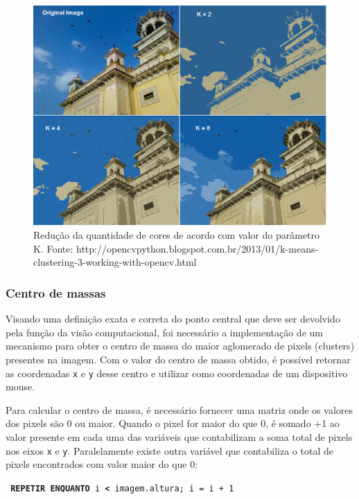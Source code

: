 \documentclass[12pt]{article}
\begin{document}
	\begin{figure}[ht!]
	\begin{center}
		\includegraphics[scale=0.3]{img/kmeansout.png}
		\footnotesize \caption{Redu\c c\~ao da quantidade de cores de acordo com valor do par\^ametro K. Fonte: http://opencvpython.blogspot.com.br/2013/01/k-means-clustering-3-working-with-opencv.html }
	\end{center}
	\end{figure}	

\subsubsection{Centro de massas}
Visando uma defini\c c\~ao exata e correta do ponto central que deve ser devolvido pela fun\c c\~ao da vis\~ao computacional,
foi necess\'ario a implementa\c c\~ao de um mecanismo para obter o centro de massa do maior aglomerado de pixels (clusters) presentes
na imagem. Com o valor do centro de massa obtido, \'e poss\'ivel retornar as coordenadas \texttt{x} e \texttt{y} desse centro e utilizar como
coordenadas de um dispositivo mouse.

Para calcular o centro de massa, \'e necess\'ario fornecer uma matriz onde os valores dos pixels s\~ao 0 ou maior.
Quando o pixel for maior do que 0, \'e somado +1 ao valor presente em cada uma das vari\'aveis que contabilizam a
soma total de pixels nos eixos \texttt{x} e \texttt{y}. Paralelamente existe outra vari\'avel que contabiliza o total de pixels
encontrados com valor maior do que 0:


\noindent \texttt{\footnotesize{ \textbf{REPETIR ENQUANTO} i \textbf{<} imagem.altura; i = i + 1} }
\end{document}
